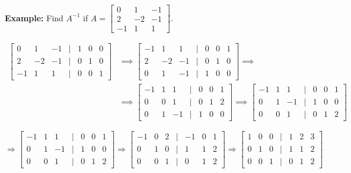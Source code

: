 \documentclass{article}
\begin{document}
\textbf{Example:} Find \( A^{-1} \) if \( A = \begin{bmatrix} 0 & 1 & -1 \\ 2 & -2 & -1 \\ -1 & 1 & 1 \end{bmatrix} \).

\begin{align*}
\begin{bmatrix}
    0 & 1 & -1 & \vert & 1 & 0 & 0 \\
    2 & -2 & -1 & \vert & 0 & 1 & 0 \\
    -1 & 1 & 1 & \vert & 0 & 0 & 1
\end{bmatrix} &\implies
\begin{bmatrix}
    -1 & 1 & 1 & \vert & 0 & 0 & 1 \\
    2 & -2 & -1 & \vert & 0 & 1 & 0 \\
    0 & 1 & -1 & \vert & 1 & 0 & 0
\end{bmatrix} \implies \\
&\implies
\begin{bmatrix}
    -1 & 1 & 1 & \vert & 0 & 0 & 1 \\
    0 & 0 & 1 & \vert & 0 & 1 & 2 \\
    0 & 1 & -1 & \vert & 1 & 0 & 0
\end{bmatrix} \implies
\begin{bmatrix}
    -1 & 1 & 1 & \vert & 0 & 0 & 1 \\
    0 & 1 & -1 & \vert & 1 & 0 & 0 \\
    0 & 0 & 1 & \vert & 0 & 1 & 2
\end{bmatrix}
\end{align*}




\[
\Rightarrow
\begin{bmatrix}
    -1 & 1 & 1 & \vert & 0 & 0 & 1 \\
    0 & 1 & -1 & \vert & 1 & 0 & 0 \\
    0 & 0 & 1 & \vert & 0 & 1 & 2
\end{bmatrix} \Rightarrow
\begin{bmatrix}
    -1 & 0 & 2 & \vert & -1 & 0 & 1 \\
    0 & 1 & 0 & \vert & 1 & 1 & 2 \\
    0 & 0 & 1 & \vert & 0 & 1 & 2
\end{bmatrix} \Rightarrow
\begin{bmatrix}
    1 & 0 & 0 & \vert & 1 & 2 & 3 \\
    0 & 1 & 0 & \vert & 1 & 1 & 2 \\
    0 & 0 & 1 & \vert & 0 & 1 & 2
\end{bmatrix}
\]
\end{document}
